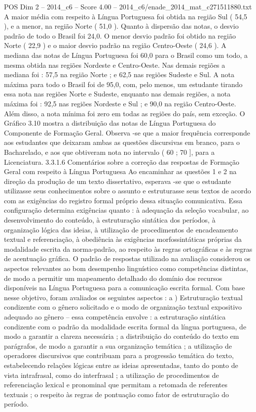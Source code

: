 \begin{textsample}{POS Dim 2 – 2014\_c6 – Score 4.00 – 2014\_c6/enade\_2014\_mat\_c271511880.txt}
A maior média com respeito à Língua Portuguesa foi obtida na região Sul ( 54,5 ), e a menor, na região Norte ( 51,0 ).
Quanto à dispersão das notas, o desvio padrão de todo o Brasil foi 24,0.
O menor desvio padrão foi obtido na região Norte ( 22,9 ) e o maior desvio padrão na região Centro-Oeste ( 24,6 ).
A mediana das notas de Língua Portuguesa foi 60,0 para o Brasil como um todo, a mesma obtida nas regiões Nordeste e Centro-Oeste.
Nas demais regiões a mediana foi : 57,5 na região Norte ; e 62,5 nas regiões Sudeste e Sul.
A nota máxima para todo o Brasil foi de 95,0, com, pelo menos, um estudante tirando essa nota nas regiões Norte e Sudeste, enquanto nas demais regiões, a nota máxima foi : 92,5 nas regiões Nordeste e Sul ; e 90,0 na região Centro-Oeste.
Além disso, a nota mínima foi zero em todas as regiões do país, sem exceção.
O Gráfico 3.10 mostra a distribuição das notas de Língua Portuguesa do Componente de Formação Geral.
Observa -se que a maior frequência corresponde aos estudantes que deixaram ambas as questões discursivas em branco, para o Bacharelado, e aos que obtiveram nota no intervalo ( 60 ; 70 ], para a Licenciatura. 3.3.1.6 Comentários sobre a correção das respostas de Formação Geral com respeito à Língua Portuguesa Ao encaminhar as questões 1 e 2 na direção da produção de um texto dissertativo, esperava -se que o estudante utilizasse seus conhecimentos sobre o assunto e estruturasse seus textos de acordo com as exigências do registro formal próprio dessa situação comunicativa.
Essa configuração determina exigências quanto : à adequação da seleção vocabular, ao desenvolvimento do conteúdo, à estruturação sintática dos períodos, à organização lógica das ideias, à utilização de procedimentos de encadeamento textual e referenciação, à obediência às exigências morfossintáticas próprias da modalidade escrita da norma-padrão, ao respeito às regras ortográficas e às regras de acentuação gráfica.
O padrão de respostas utilizado na avaliação considerou os aspectos relevantes ao bom desempenho linguístico como competências distintas, de modo a permitir um mapeamento detalhado do domínio dos recursos disponíveis na Língua Portuguesa para a comunicação escrita formal.
Com base nesse objetivo, foram avaliados os seguintes aspectos : a ) Estruturação textual condizente com o gênero solicitado e o modo de organização textual expositivo adequado ao gênero – essa competência envolve : a estruturação sintática condizente com o padrão da modalidade escrita formal da língua portuguesa, de modo a garantir a clareza necessária ; a distribuição do conteúdo do texto em parágrafos, de modo a garantir a sua organização temática ; a utilização de operadores discursivos que contribuam para a progressão temática do texto, estabelecendo relações lógicas entre as ideias apresentadas, tanto do ponto de vista intrafrasal, como do interfrasal ; a utilização de procedimentos de referenciação lexical e pronominal que permitam a retomada de referentes textuais ; o respeito às regras de pontuação como fator de estruturação do período.

\end{textsample}
